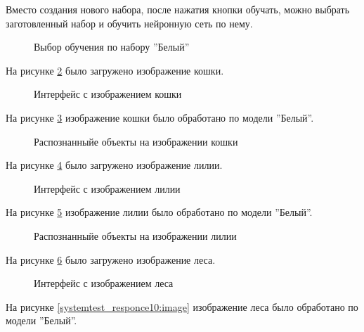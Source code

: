 Вместо создания нового набора, после нажатия кнопки обучать, можно выбрать заготовленный набор и обучить нейронную сеть по нему.

\begin{figure}[H]
\caption{Выбор обучения по набору ''Белый''}
\label{systemtest_train3:image}
\end{figure}

На рисунке \ref{systemtest_responce5:image} было загружено изображение кошки.

\begin{figure}[H]
\caption{Интерфейс с изображением кошки}
\label{systemtest_responce5:image}
\end{figure}

На рисунке \ref{systemtest_responce6:image} изображение кошки было обработано по модели ''Белый''.

\begin{figure}[H]
\caption{Распознанныйе объекты на изображении кошки}
\label{systemtest_responce6:image}
\end{figure}
На рисунке \ref{systemtest_responce7:image} было загружено изображение лилии.

\begin{figure}[H]
\caption{Интерфейс с изображением лилии}
\label{systemtest_responce7:image}
\end{figure}

На рисунке \ref{systemtest_responce8:image} изображение лилии было обработано по модели ''Белый''.

\begin{figure}[H]
\caption{Распознанныйе объекты на изображении лилии}
\label{systemtest_responce8:image}
\end{figure}
На рисунке \ref{systemtest_responce9:image} было загружено изображение леса.

\begin{figure}[H]
\caption{Интерфейс с изображением леса}
\label{systemtest_responce9:image}
\end{figure}

На рисунке \ref{systemtest_responce10:image} изображение леса было обработано по модели ''Белый''.

